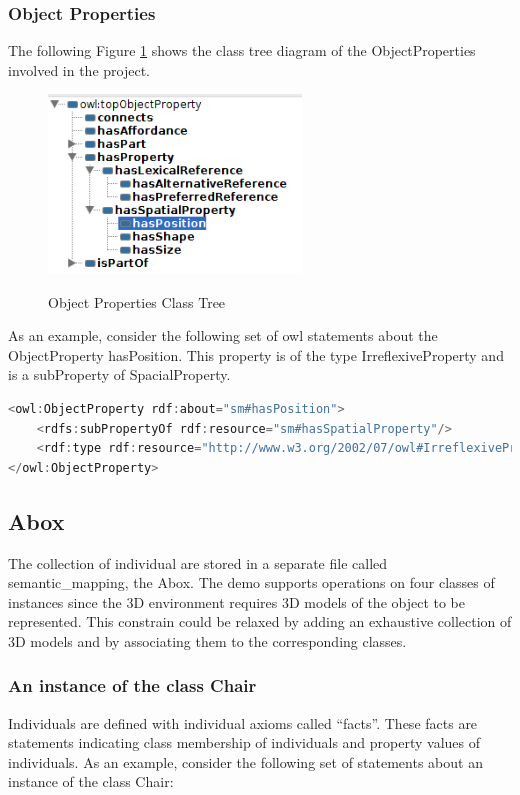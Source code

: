 \subsubsection*{Object Properties}

The following Figure \ref{fig:propClassTree} shows the class tree diagram of the ObjectProperties involved in the project.
\begin{figure}[H]
\centering
\includegraphics[width=0.6\textwidth]{imgs/propClassTree.png}
\label{fig:propClassTree}
\caption{Object Properties Class Tree}
\end{figure}

As an example, consider the following set of owl statements about the ObjectProperty hasPosition. This property is of the type IrreflexiveProperty and is a subProperty of SpacialProperty.

\begin{lstlisting}[language=Java,basicstyle=\fontsize{9}{9}\selectfont\ttfamily]
<owl:ObjectProperty rdf:about="sm#hasPosition">
    <rdfs:subPropertyOf rdf:resource="sm#hasSpatialProperty"/>
    <rdf:type rdf:resource="http://www.w3.org/2002/07/owl#IrreflexiveProperty"/>
</owl:ObjectProperty>
\end{lstlisting}    


\subsection{Abox}
\label{subsec:abox}
The collection of individual are stored in a separate file called semantic\_mapping, the Abox. The demo supports operations on four classes of instances since the 3D environment requires 3D models of the object to be represented. This constrain could be relaxed by adding an exhaustive collection of 3D models and by associating them to the corresponding classes.\\

\subsubsection*{An instance of the class Chair}
Individuals are defined with individual axioms called ``facts''. These facts are statements indicating class membership of individuals and property values of individuals. As an example, consider the following set of statements about an instance of the class Chair:

